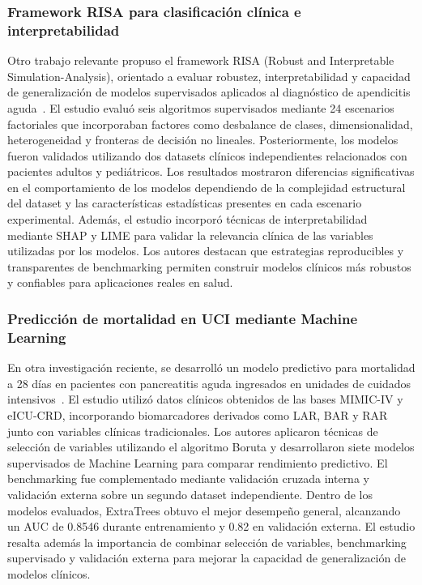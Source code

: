 \subsubsection{Framework RISA para clasificación clínica e interpretabilidad}

Otro trabajo relevante propuso el framework RISA (Robust and Interpretable Simulation-Analysis), orientado a evaluar robustez, interpretabilidad y capacidad de generalización de modelos supervisados aplicados al diagnóstico de apendicitis aguda~\citep{uddin2026}.
El estudio evaluó seis algoritmos supervisados mediante 24 escenarios factoriales que incorporaban factores como desbalance de clases, dimensionalidad, heterogeneidad y fronteras de decisión no lineales. Posteriormente, los modelos fueron validados utilizando dos datasets clínicos independientes relacionados con pacientes adultos y pediátricos.
Los resultados mostraron diferencias significativas en el comportamiento de los modelos dependiendo de la complejidad estructural del dataset y las características estadísticas presentes en cada escenario experimental. Además, el estudio incorporó técnicas de interpretabilidad mediante SHAP y LIME para validar la relevancia clínica de las variables utilizadas por los modelos.
Los autores destacan que estrategias reproducibles y transparentes de benchmarking permiten construir modelos clínicos más robustos y confiables para aplicaciones reales en salud.

\subsubsection{Predicción de mortalidad en UCI mediante Machine Learning}

En otra investigación reciente, se desarrolló un modelo predictivo para mortalidad a 28 días en pacientes con pancreatitis aguda ingresados en unidades de cuidados intensivos~\citep{wei2026}. El estudio utilizó datos clínicos obtenidos de las bases MIMIC-IV y eICU-CRD, incorporando biomarcadores derivados como LAR, BAR y RAR junto con variables clínicas tradicionales.
Los autores aplicaron técnicas de selección de variables utilizando el algoritmo Boruta y desarrollaron siete modelos supervisados de Machine Learning para comparar rendimiento predictivo. El benchmarking fue complementado mediante validación cruzada interna y validación externa sobre un segundo dataset independiente.
Dentro de los modelos evaluados, ExtraTrees obtuvo el mejor desempeño general, alcanzando un AUC de 0.8546 durante entrenamiento y 0.82 en validación externa. El estudio resalta además la importancia de combinar selección de variables, benchmarking supervisado y validación externa para mejorar la capacidad de generalización de modelos clínicos.
